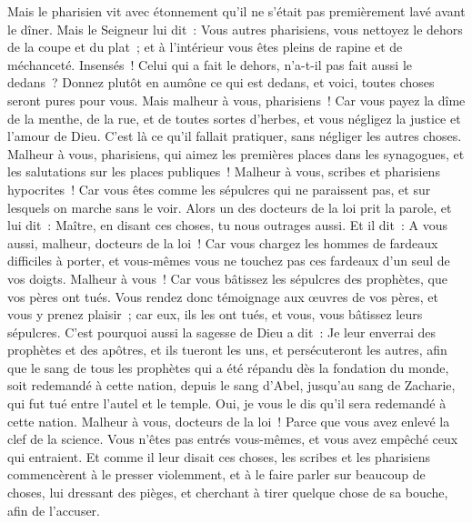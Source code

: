 \begin{multicols}{2}
Mais le pharisien vit avec étonnement qu'il ne s'était pas premièrement lavé avant le dîner.
Mais le Seigneur lui dit~: Vous autres pharisiens, vous nettoyez le dehors de la coupe et du plat~; et à l'intérieur vous êtes pleins de rapine et de méchanceté.
Insensés~! Celui qui a fait le dehors, n'a-t-il pas fait aussi le dedans~?
Donnez plutôt en aumône ce qui est dedans, et voici, toutes choses seront pures pour vous.
Mais malheur à vous, pharisiens~! Car vous payez la dîme de la menthe, de la rue, et de toutes sortes d'herbes, et vous négligez la justice et l'amour de Dieu. C'est là ce qu'il fallait pratiquer, sans négliger les autres choses.
Malheur à vous, pharisiens, qui aimez les premières places dans les synagogues, et les salutations sur les places publiques~!
Malheur à vous, scribes et pharisiens hypocrites~! Car vous êtes comme les sépulcres qui ne paraissent pas, et sur lesquels on marche sans le voir.
Alors un des docteurs de la loi prit la parole, et lui dit~: Maître, en disant ces choses, tu nous outrages aussi.
Et il dit~: A vous aussi, malheur, docteurs de la loi~! Car vous chargez les hommes de fardeaux difficiles à porter, et vous-mêmes vous ne touchez pas ces fardeaux d'un seul de vos doigts.
Malheur à vous~! Car vous bâtissez les sépulcres des prophètes, que vos pères ont tués.
Vous rendez donc témoignage aux œuvres de vos pères, et vous y prenez plaisir~; car eux, ils les ont tués, et vous, vous bâtissez leurs sépulcres.
C'est pourquoi aussi la sagesse de Dieu a dit~: Je leur enverrai des prophètes et des apôtres, et ils tueront les uns, et persécuteront les autres,
afin que le sang de tous les prophètes qui a été répandu dès la fondation du monde, soit redemandé à cette nation,
depuis le sang d'Abel, jusqu'au sang de Zacharie, qui fut tué entre l'autel et le temple. Oui, je vous le dis qu'il sera redemandé à cette nation.
Malheur à vous, docteurs de la loi~! Parce que vous avez enlevé la clef de la science. Vous n'êtes pas entrés vous-mêmes, et vous avez empêché ceux qui entraient.
Et comme il leur disait ces choses, les scribes et les pharisiens commencèrent à le presser violemment, et à le faire parler sur beaucoup de choses,
lui dressant des pièges, et cherchant à tirer quelque chose de sa bouche, afin de l'accuser.

\end{multicols}
